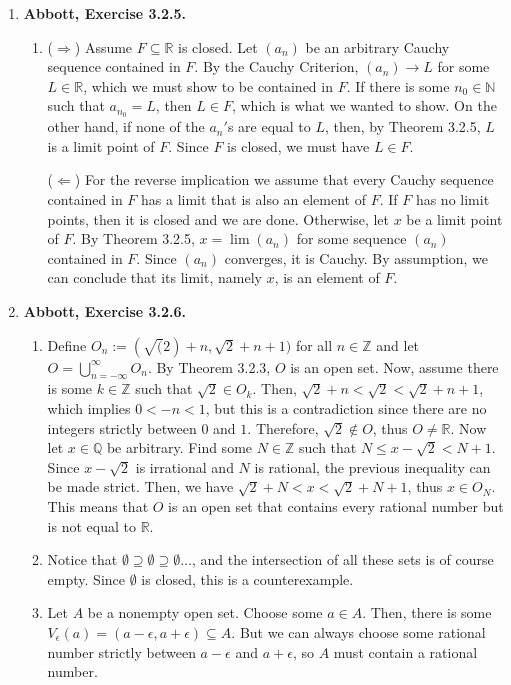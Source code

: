 \documentclass{article}
\newcommand{\N}{\mathbb{N}}
\newcommand{\Z}{\mathbb{Z}}
\newcommand{\Q}{\mathbb{Q}}
\newcommand{\R}{\mathbb{R}}
\newcommand{\exc}[2][Abbott]{\item \textbf{#1, Exercise #2.}}
\begin{document}
\begin{enumerate}
    \exc{3.2.5}
    \begin{enumerate}
        \item ($\Rightarrow$) Assume $F \subseteq \R$ is closed. Let $(a_n)$ be an arbitrary Cauchy sequence contained in $F$. By the Cauchy Criterion, $(a_n) \to L$ for some $L \in \R$, which we must show to be contained in $F$. If there is some $n_0 \in \N$ such that $a_{n_0} = L$, then $L \in F$, which is what we wanted to show. On the other hand, if none of the $a_n'$s are equal to $L$, then, by Theorem 3.2.5, $L$ is a limit point of $F$. Since $F$ is closed, we must have $L \in F$.
        
        ($\Leftarrow$) For the reverse implication we assume that every Cauchy sequence contained in $F$ has a limit that is also an element of $F$. If $F$ has no limit points, then it is closed and we are done. Otherwise, let $x$ be a limit point of $F$. By Theorem 3.2.5, $x = \lim(a_n)$ for some sequence $(a_n)$ contained in $F$. Since $(a_n)$ converges, it is Cauchy. By assumption, we can conclude that its limit, namely $x$, is an element of $F$.
    \end{enumerate}
    
    \exc{3.2.6}
    \begin{enumerate}
        \item Define $O_n := (\sqrt(2)+n,\sqrt{2}+n+1)$ for all $n \in \Z$ and let $O = \bigcup_{n=-\infty}^\infty O_n$. By Theorem 3.2.3, $O$ is an open set. Now, assume there is some $k \in \Z$ such that $\sqrt{2} \in O_k$. Then, $\sqrt{2}+n<\sqrt{2} < \sqrt{2}+n+1$, which implies $0 < -n < 1$, but this is a contradiction since there are no integers strictly between $0$ and $1$. Therefore, $\sqrt{2} \notin O$, thus $O \neq \R$. Now let $x \in \Q$ be arbitrary. Find some $N \in \Z$ such that $N \leq x-\sqrt{2} < N+1$. Since $x-\sqrt{2}$ is irrational and $N$ is rational, the previous inequality can be made strict. Then, we have $\sqrt{2} + N < x < \sqrt{2} + N + 1$, thus $x \in O_N$. This means that $O$ is an open set that contains every rational number but is not equal to $\R$.
        
        \item Notice that $\emptyset \supseteq \emptyset \supseteq \emptyset \dots$, and the intersection of all these sets is of course empty. Since $\emptyset$ is closed, this is a counterexample.
        
        \item Let $A$ be a nonempty open set. Choose some $a \in A$. Then, there is some $V_\epsilon(a) = (a-\epsilon, a+\epsilon) \subseteq A$. But we can always choose some rational number strictly between $a-\epsilon$ and $a + \epsilon$, so $A$ must contain a rational number.
        

\end{enumerate}
\end{enumerate}
\end{document}
